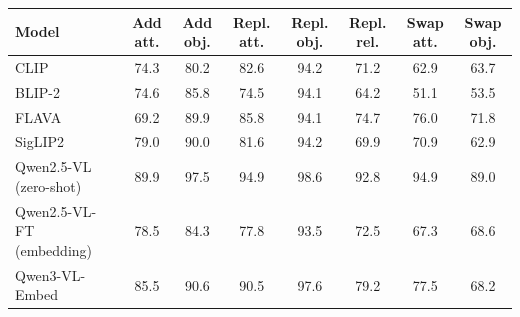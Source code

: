 \begin{tabular}{l ccccccc}
\toprule
Model & Add att. & Add obj. & Repl. att. & Repl. obj. & Repl. rel. & Swap att. & Swap obj.\\
\midrule
CLIP & 74.3 & 80.2 & 82.6 & 94.2 & 71.2 & 62.9 & 63.7 \\
BLIP-2 & 74.6 & 85.8 & 74.5 & 94.1 & 64.2 & 51.1 & 53.5 \\
FLAVA & 69.2 & 89.9 & 85.8 & 94.1 & 74.7 & 76.0 & 71.8 \\
SigLIP2 & 79.0 & 90.0 & 81.6 & 94.2 & 69.9 & 70.9 & 62.9 \\
Qwen2.5-VL (zero-shot) & 89.9 & 97.5 & 94.9 & 98.6 & 92.8 & 94.9 & 89.0 \\
Qwen2.5-VL-FT (embedding) & 78.5 & 84.3 & 77.8 & 93.5 & 72.5 & 67.3 & 68.6 \\
Qwen3-VL-Embed & 85.5 & 90.6 & 90.5 & 97.6 & 79.2 & 77.5 & 68.2 \\
\bottomrule
\end{tabular}

